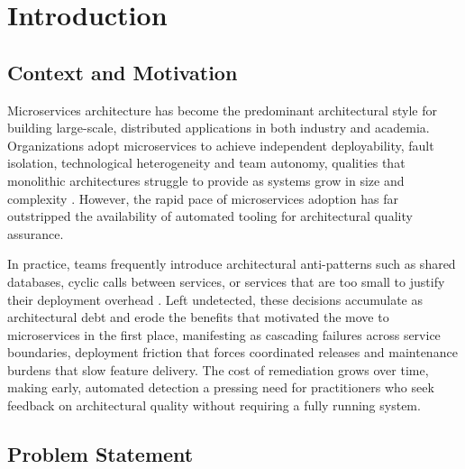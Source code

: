 \chapter{Introduction}

\section{Context and Motivation}
\label{sec:context}

\par Microservices architecture has become the predominant architectural style for building large-scale, distributed applications in both industry and academia. Organizations adopt microservices to achieve independent deployability, fault isolation, technological heterogeneity and team autonomy, qualities that monolithic architectures struggle to provide as systems grow in size and complexity \cite{Newman2015, Richardson2018}. However, the rapid pace of microservices adoption has far outstripped the availability of automated tooling for architectural quality assurance.

\par In practice, teams frequently introduce architectural anti-patterns such as shared databases, cyclic calls between services, or services that are too small to justify their deployment overhead \cite{Taibi2018}. Left undetected, these decisions accumulate as architectural debt and erode the benefits that motivated the move to microservices in the first place, manifesting as cascading failures across service boundaries, deployment friction that forces coordinated releases and maintenance burdens that slow feature delivery. The cost of remediation grows over time, making early, automated detection a pressing need for practitioners who seek feedback on architectural quality without requiring a fully running system.

\section{Problem Statement}
\label{sec:problem-statement}


